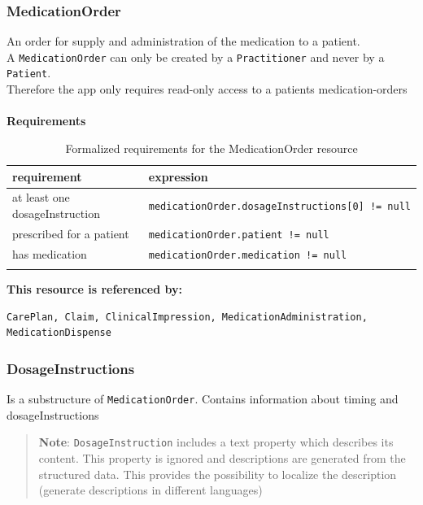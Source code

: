 \documentclass{article}
\begin{document}
\subsubsection{MedicationOrder}\label{res:medicationorder}

An order for supply and administration of the medication to a patient.
\\
A \texttt{MedicationOrder} can only be created by a
\texttt{Practitioner} and never by a \texttt{Patient}.
\\
Therefore the app only requires read-only access to a patients
medication-orders
\\
\\
\textbf{Requirements}\label{res:medicationorder:requirements}
\\
\begin{longtable}[H]{@{}ll@{}}
  \toprule
    requirement &
    expression
  \\
  \midrule
    at least one dosageInstruction &
    \texttt{medicationOrder.dosageInstructions{[}0{]}\ !=\ null}
  \\
    prescribed for a patient &
    \texttt{medicationOrder.patient\ !=\ null}
  \\
    has medication &
    \texttt{medicationOrder.medication\ !=\ null}
  \\
\bottomrule
\caption{Formalized requirements for the MedicationOrder resource}
\end{longtable}
\textbf{This resource is referenced by:}
\begin{verbatim}
CarePlan, Claim, ClinicalImpression, MedicationAdministration, MedicationDispense
\end{verbatim}

\subsubsection{DosageInstructions}\label{res:dosageinstructions}

Is a substructure of \texttt{MedicationOrder}. Contains information
about timing and dosageInstructions

\begin{quote}
\textbf{Note}: \texttt{DosageInstruction} includes a text property which
describes its content. This property is ignored and descriptions are
generated from the structured data. This provides the possibility to
localize the description (generate descriptions in different languages)
\end{quote}
\end{document}
